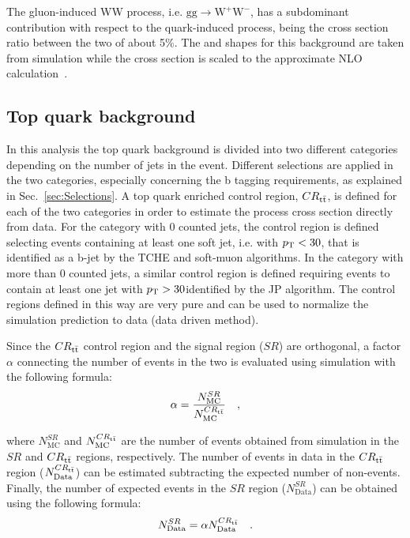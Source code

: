 The gluon-induced WW process, i.e. $\mathrm{gg\to W^{+}W^{-}}$, has a subdominant contribution with respect to the quark-induced process, being the cross section ratio between the two of about 5\%. The \mll and \mt shapes for this background are taken from simulation while the cross section is scaled to the approximate NLO calculation~\cite{Bonvini:2013jha,Passarino:2013bha}.





\subsection{Top quark background \label{sec:TTBackground}}

In this analysis the top quark background is divided into two different categories depending on the number of jets in the event. Different selections are applied in the two categories, especially concerning the b tagging requirements, as explained in Sec.~\ref{sec:Selections}.
A top quark enriched control region, $CR_{\mathrm{t}\bar{\mathrm{t}}}$, is defined for each of the two categories in order to estimate the process cross section directly from data. For the category with 0 counted jets, the control region is defined selecting events containing at least one soft jet, i.e. with $p_\mathrm{T} < 30$\GeV, that is identified as a b-jet by the TCHE and soft-muon algorithms. In the category with more than 0 counted jets, a similar control region is defined requiring events to contain at least one jet with $p_\mathrm{T}>30$\GeV identified by the JP algorithm. The control regions defined in this way are very pure and can be used to normalize the simulation prediction to data (data driven method).

Since the $CR_{\mathrm{t}\bar{\mathrm{t}}}$ control region and the signal region ($SR$) are orthogonal, a factor $\alpha$ connecting the number of events in the two is evaluated using simulation with the following formula:
\begin{equation}
\alpha = \frac{N_\mathrm{MC}^{SR}}{N_\mathrm{MC}^{CR_{\mathrm{t}\bar{\mathrm{t}}}}} \quad ,
\end{equation}

\noindent where $N_\mathrm{MC}^{SR}$ and $N_\mathrm{MC}^{CR_{\mathrm{t}\bar{\mathrm{t}}}}$ are the number of \ttbar events obtained from simulation in the $SR$ and $CR_{\mathrm{t}\bar{\mathrm{t}}}$ regions, respectively. The number of \ttbar events in data in the $CR_{\mathrm{t}\bar{\mathrm{t}}}$ region ($N_\mathrm{Data}^{CR_{\mathrm{t}\bar{\mathrm{t}}}}$) can be estimated subtracting the expected number of non-\ttbar events. Finally, the number of expected events in the $SR$ region ($N_\mathrm{Data}^{SR}$) can be obtained using the following formula:
\begin{equation}
N_\mathrm{Data}^{SR} = \alpha N_\mathrm{Data}^{CR_{\mathrm{t}\bar{\mathrm{t}}}} \quad .
\end{equation}

